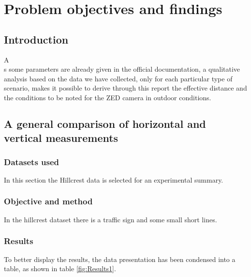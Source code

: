 \chapter{Problem objectives and findings}

\section*{Introduction}

\lettrine[lines=2]{A}\\s some parameters are already given in the official documentation, a qualitative analysis based on the data we have collected, only for each particular type of scenario, makes it possible to derive through this report the effective distance and the conditions to be noted for the ZED camera in outdoor conditions.

\section{A general comparison of horizontal and vertical measurements}

\subsection{Datasets used}

In this section the Hillcrest data is selected for an experimental summary. 

\subsection{Objective and method}

In the hillcrest dataset there is a traffic sign and some small short lines. 

\subsection{Results}

To better display the results, the data presentation has been condensed into a table, as shown in table \ref{fig:Results1}.

